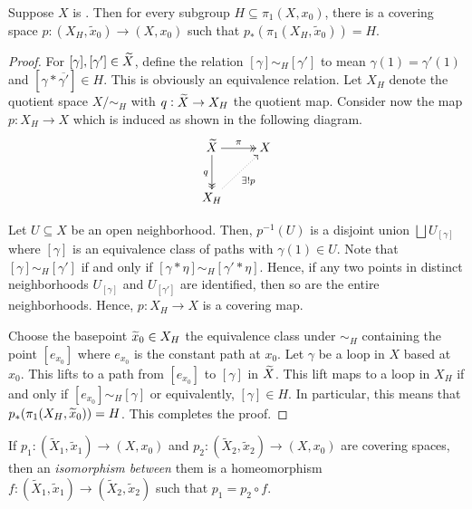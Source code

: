 \begin{theorem}
    Suppose $X$ is \nice. Then for every subgroup $H\subseteq\pi_1(X,x_0)$, there is a covering space $p: (X_H,\widetilde x_0)\to (X,x_0)$  such that $p_*(\pi_1(X_H,\widetilde{x}_0)) = H$.
\end{theorem}
\begin{proof}
    For $[\gamma],[\gamma']\in\widetilde{X}$, define the relation $[\gamma]\sim_H[\gamma']$ to mean $\gamma(1) = \gamma'(1)$ and $[\gamma\ast\overline{\gamma'}]\in H$. This is obviously an equivalence relation. Let $X_H$ denote the quotient space $X/\sim_H$ with $q:\widetilde{X}\to X_H$ the quotient map. Consider now the map $p: X_H\to X$ which is induced as shown in the following diagram. 
    \begin{equation*}
        \xymatrix {
            \wt X \ar@{->>}[r]^\pi\ar@{->>}[d]_q & X\\
            X_H\ar@{.>}[ru]_{\exists! p}
        }
    \end{equation*}

    Let $U\subseteq X$ be an open neighborhood. Then, $p^{-1}(U)$ is a disjoint union $\bigsqcup U_{[\gamma]}$ where $[\gamma]$ is an equivalence class of paths with $\gamma(1)\in U$. Note that $[\gamma]\sim_H[\gamma']$ if and only if $[\gamma\ast\eta]\sim_H[\gamma'\ast\eta]$. Hence, if any two points in distinct neighborhoods $U_{[\gamma]}$ and $U_{[\gamma']}$ are identified, then so are the entire neighborhoods. Hence, $p: X_H\to X$ is a covering map.

    Choose the basepoint $\widetilde{x}_0\in X_H$ the equivalence class under $\sim_H$ containing the point $[e_{x_0}]$ where $e_{x_0}$ is the constant path at $x_0$. Let $\gamma$ be a loop in $X$ based at $x_0$. This lifts to a path from $[e_{x_0}]$ to $[\gamma]$ in $\widetilde{X}$. This lift maps to a loop in $X_H$ if and only if $[e_{x_0}]\sim_H[\gamma]$ or equivalently, $[\gamma]\in H$. In particular, this means that $p_\ast(\pi_1(X_H, \widetilde{x}_0)) = H$. This completes the proof.
\end{proof}

\begin{definition}
    If $p_1: (\widetilde X_1,\widetilde x_1)\to(X,x_0)$ and $p_2:(\widetilde X_2,\widetilde x_2)\to(X,x_0)$ are covering spaces, then an \textit{isomorphism between} them is a homeomorphism $f: (\widetilde X_1,\widetilde x_1)\to(\widetilde X_2,\widetilde x_2)$ such that $p_1 = p_2\circ f$.
\end{definition}


